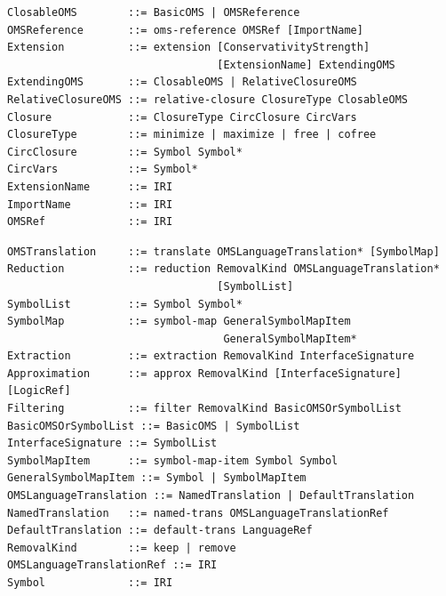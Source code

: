 \documentclass[10pt, a4paper]{isov2}
\newcommand*{\syntax}[1]{\texttt{#1}}
\begin{document}
\begin{lstlisting}[language=ebnf,escapeinside={@@}]  % abstract syntax
ClosableOMS        ::= BasicOMS | OMSReference
OMSReference       ::= oms-reference OMSRef [ImportName]
Extension          ::= extension [ConservativityStrength]
                                 [ExtensionName] ExtendingOMS
ExtendingOMS       ::= ClosableOMS | RelativeClosureOMS
RelativeClosureOMS ::= relative-closure ClosureType ClosableOMS
Closure            ::= ClosureType CircClosure CircVars
ClosureType        ::= minimize | maximize | free | cofree
CircClosure        ::= Symbol Symbol*
CircVars           ::= Symbol*
ExtensionName      ::= IRI
ImportName         ::= IRI
OMSRef             ::= IRI
\end{lstlisting}


\begin{lstlisting}[language=ebnf,escapeinside={@@}]  % abstract syntax
OMSTranslation     ::= translate OMSLanguageTranslation* [SymbolMap]
Reduction          ::= reduction RemovalKind OMSLanguageTranslation*
                                 [SymbolList]
SymbolList         ::= Symbol Symbol*
SymbolMap          ::= symbol-map GeneralSymbolMapItem
                                  GeneralSymbolMapItem*
Extraction         ::= extraction RemovalKind InterfaceSignature
Approximation      ::= approx RemovalKind [InterfaceSignature] [LogicRef]
Filtering          ::= filter RemovalKind BasicOMSOrSymbolList
BasicOMSOrSymbolList ::= BasicOMS | SymbolList
InterfaceSignature ::= SymbolList
SymbolMapItem      ::= symbol-map-item Symbol Symbol
GeneralSymbolMapItem ::= Symbol | SymbolMapItem
OMSLanguageTranslation ::= NamedTranslation | DefaultTranslation
NamedTranslation   ::= named-trans OMSLanguageTranslationRef
DefaultTranslation ::= default-trans LanguageRef
RemovalKind        ::= keep | remove
OMSLanguageTranslationRef ::= IRI
Symbol             ::= IRI
\end{lstlisting}
\end{document}
